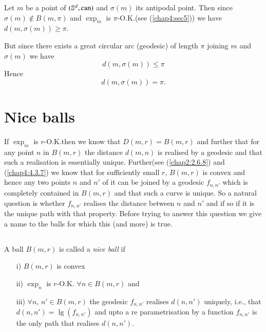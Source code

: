 \begin{example*}
Let $m$ be a point of $(\mathbb{S}^{d},\operatorname{can})$ and $\sigma(m)$ its
antipodal point. Then since $\sigma(m)\not\in B(m,\pi)$ and $\exp_{m}$
is $\pi$-O.K.\@ (see (\ref{chap4:sec5})) we have\break $d(m,\sigma(m))\geq \pi$.
\end{example*}

But since there exists a great circular arc (geodesic) of length $\pi$
joining $m$ and $\sigma(m)$ we have
$$
d(m,\sigma(m))\leq \pi
$$
Hence
$$
d(m,\sigma(m))=\pi.
$$

\section{Nice balls}\label{chap7:chap7-sec3}

If $\exp_{m}$ is $r$-O.K.\@ then we know that $D(m,r)=B(m,r)$ and
further that for any point $n$ in $B(m,r)$ the distance $d(m,n)$ is
realised by a geodesic and that such a realisation is essentially
unique. Further\pageoriginale (see (\ref{chap2:2.6.8}) and (\ref{chap4:4.3.7})
we know that for sufficiently small $r$, $B(m,r)$ is convex and hence
any two points $n$ and $n'$ of it can be joined by a geodesic
$f_{n,n'}$ which is completely contained in $B(m,r)$ and that such a
curve is unique. So a natural question is whether $f_{n,n'}$ realises
the distance between $n$ and $n'$ and if so if it is the unique path
with that property. Before trying to answer this question we give a
name to the balls for which this (and more) is true.

\subsection{}\label{chap7:7.3.1}

\begin{defi*}
A ball $B(m,r)$ is called a {\em nice ball} if
\begin{itemize}
\item[\rm i)] $B(m,r)$ is convex

\item[\rm ii)] $\exp_{n}$ is $r$-O.K. $\forall n\in B(m,r)$ and

\item[\rm iii)] $\forall n$, $n'\in B(m,r)$ the geodesic $f_{n,n'}$
realises $d(n,n')$ uniquely, i.e., that $d(n,n')=\lg(f_{n,n'})$ and
upto a re parametrisation by a function $f_{n,n'}$ is the only path
that realises $d(n,n')$.
\end{itemize}
\end{defi*}

